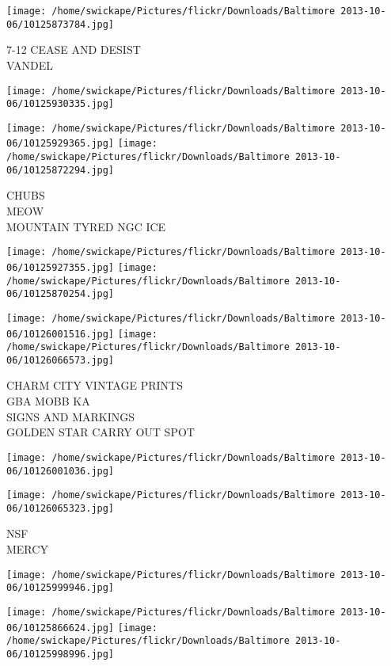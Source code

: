 \documentclass[10pt,letterpaper]{article}
\begin{document}
\vspace{0.25in}
\texttt{[image: /home/swickape/Pictures/flickr/Downloads/Baltimore 2013-10-06/10125873784.jpg]}

7{-}12 CEASE AND DESIST\\
VANDEL
\pagebreak

\texttt{[image: /home/swickape/Pictures/flickr/Downloads/Baltimore 2013-10-06/10125930335.jpg]}

\vspace{0.25in}
\texttt{[image: /home/swickape/Pictures/flickr/Downloads/Baltimore 2013-10-06/10125929365.jpg]}
\texttt{[image: /home/swickape/Pictures/flickr/Downloads/Baltimore 2013-10-06/10125872294.jpg]}

CHUBS\\
MEOW\\
MOUNTAIN TYRED NGC ICE
\pagebreak

\texttt{[image: /home/swickape/Pictures/flickr/Downloads/Baltimore 2013-10-06/10125927355.jpg]}
\texttt{[image: /home/swickape/Pictures/flickr/Downloads/Baltimore 2013-10-06/10125870254.jpg]}

\texttt{[image: /home/swickape/Pictures/flickr/Downloads/Baltimore 2013-10-06/10126001516.jpg]}
\texttt{[image: /home/swickape/Pictures/flickr/Downloads/Baltimore 2013-10-06/10126066573.jpg]}

CHARM CITY VINTAGE PRINTS\\
GBA MOBB KA\\
SIGNS AND MARKINGS\\
GOLDEN STAR CARRY OUT SPOT
\pagebreak

\texttt{[image: /home/swickape/Pictures/flickr/Downloads/Baltimore 2013-10-06/10126001036.jpg]}

\vspace{0.25in}
\texttt{[image: /home/swickape/Pictures/flickr/Downloads/Baltimore 2013-10-06/10126065323.jpg]}

NSF\\
MERCY
\pagebreak

\texttt{[image: /home/swickape/Pictures/flickr/Downloads/Baltimore 2013-10-06/10125999946.jpg]}

\vspace{0.25in}
\texttt{[image: /home/swickape/Pictures/flickr/Downloads/Baltimore 2013-10-06/10125866624.jpg]}
\texttt{[image: /home/swickape/Pictures/flickr/Downloads/Baltimore 2013-10-06/10125998996.jpg]}
\end{document}
